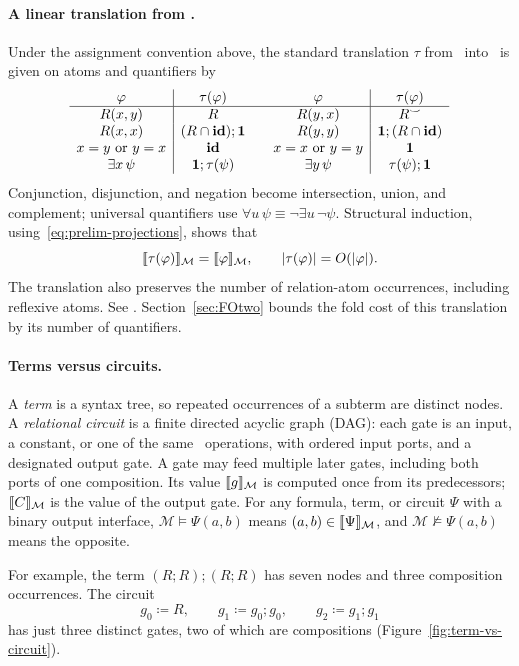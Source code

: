 \paragraph{A linear translation from \FOtwo.}\label{sec:FOtwo-translation}
Under the assignment convention above, the standard translation
$\tau$ from \FOtwo\ into \CoR\ is given on atoms and quantifiers by
\[
\begin{array}{c|c@{\qquad}c|c}
 \varphi&\tau(\varphi)&\varphi&\tau(\varphi)\\\hline
 R(x,y)&R&R(y,x)&R^\smile\\
 R(x,x)&(R\cap\id);\one&R(y,y)&\one;(R\cap\id)\\
 x=y\ \text{or}\ y=x&\id&x=x\ \text{or}\ y=y&\one\\
 \exists x\,\psi&\one;\tau(\psi)&
 \exists y\,\psi&\tau(\psi);\one
\end{array}
\]
Conjunction, disjunction, and negation become intersection, union, and
complement; universal quantifiers use
$\forall u\,\psi\equiv\neg\exists u\,\neg\psi$. Structural induction,
using~\eqref{eq:prelim-projections}, shows that
\[
 \llbracket \tau(\varphi)\rrbracket_{\mathcal M}
   =\llbracket \varphi\rrbracket_{\mathcal M},\qquad
 |\tau(\varphi)|=O(|\varphi|).
\]
The translation also preserves the number of relation-atom
occurrences, including reflexive atoms. See
\citep[Remark~3.22]{nakamura2022}. Section~\ref{sec:FOtwo} bounds the fold cost of this translation
by its number of quantifiers.

\paragraph{Terms versus circuits.}
A \emph{term} is a syntax tree, so repeated occurrences of a subterm
are distinct nodes. A \emph{relational circuit} is a finite directed
acyclic graph (DAG): each gate is an input, a constant, or one of the
same \CoR\ operations, with ordered input ports, and a designated
output gate. A gate may feed multiple later gates, including both
ports of one composition. Its value $\llbracket g\rrbracket_{\mathcal M}$ is computed
once from its predecessors; $\llbracket C\rrbracket_{\mathcal M}$ is the value of the
output gate. For any formula, term, or circuit $\Psi$ with a binary
output interface, $\mathcal M\models\Psi(a,b)$ means
$(a,b)\in\llbracket \Psi\rrbracket_{\mathcal M}$, and
$\mathcal M\not\models\Psi(a,b)$ means the opposite.

For example, the term $(R;R);(R;R)$ has seven nodes and three
composition occurrences. The circuit
\[
 g_0\coloneqq R,\qquad g_1\coloneqq g_0;g_0,\qquad g_2\coloneqq g_1;g_1
\]
has just three distinct gates, two of which are compositions
(Figure~\ref{fig:term-vs-circuit}).

